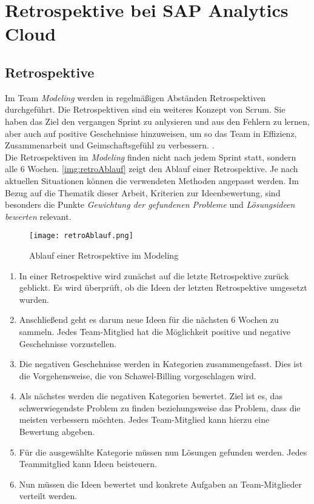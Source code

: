 \section{Retrospektive bei SAP Analytics Cloud}\label{sec:retro}
\subsection{Retrospektive}
Im Team \textit{Modeling} werden in regelmäßigen Abständen Retrospektiven durchgeführt. 
Die Retrospektiven sind ein weiteres Konzept von Scrum. Sie haben das Ziel den vergangen Sprint zu anlysieren und aus den Fehlern zu lernen, aber auch  auf positive 
Geschehnisse hinzuweisen, um so das Team in Effizienz, Zusammenarbeit und Geimschaftsgefühl zu verbessern. \cite{retro:2018}. \\
Die Retrospektiven im \textit{Modeling} finden nicht nach jedem Sprint statt, sondern alle 6 Wochen.
\autoref{img:retroAblauf} zeigt den Ablauf einer Retrospektive. Je nach aktuellen Situationen können die 
verwendeten Methoden angepasst werden. Im Bezug auf die Thematik dieser Arbeit, Kriterien zur Ideenbewertung,  
sind besonders die Punkte \textit{Gewichtung der gefundenen Probleme} und \textit{Lösungsideen bewerten} relevant.
\begin{figure}[ht]
	\centering
	\texttt{[image: retroAblauf.png]}
    \caption{Ablauf einer Retrospektive im Modeling}
	\label{img:retroAblauf}
\end{figure}
\begin{enumerate}
    \item In einer Retrospektive wird zunächst auf die letzte Retrospektive zurück geblickt. Es wird überprüft, ob die Ideen der letzten 
        Retrospektive umgesetzt wurden.
    \item Anschließend geht es darum neue Ideen für die nächsten 6 Wochen zu sammeln. Jedes Team-Mitglied
        hat die Möglichkeit positive und negative Geschehnisse vorzustellen.
    \item Die negativen Geschehnisse werden in Kategorien zusammengefasst. Dies ist die Vorgehensweise, die von Schawel-Billing vorgeschlagen wird.
    \item Als nächstes werden die negativen Kategorien bewertet. Ziel ist es, das schwerwiegendste Problem zu finden beziehungsweise 
    das Problem, dass die meisten verbessern möchten. Jedes Team-Mitglied kann hierzu eine Bewertung abgeben. 
    \item Für die ausgewählte Kategorie müssen nun Lösungen gefunden werden. Jedes Teammitglied kann Ideen beisteuern. 
    \item Nun müssen die Ideen bewertet und konkrete Aufgaben an Team-Mitglieder verteilt werden.
\end{enumerate}

